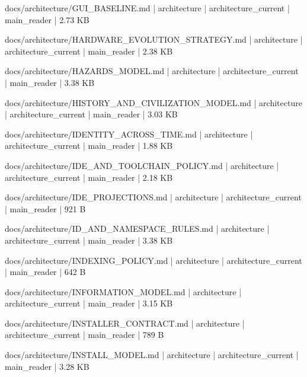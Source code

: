 \documentclass[11pt,a4paper]{report}
\begin{document}
{\small\ttfamily\raggedright docs/\allowbreak{}architecture/\allowbreak{}GUI\_BASELINE.\allowbreak{}md | architecture | architecture\_current | main\_reader | 2.\allowbreak{}73 KB\par}
{\small\ttfamily\raggedright docs/\allowbreak{}architecture/\allowbreak{}HARDWARE\_EVOLUTION\_STRATEGY.\allowbreak{}md | architecture | architecture\_current | main\_reader | 2.\allowbreak{}38 KB\par}
{\small\ttfamily\raggedright docs/\allowbreak{}architecture/\allowbreak{}HAZARDS\_MODEL.\allowbreak{}md | architecture | architecture\_current | main\_reader | 3.\allowbreak{}38 KB\par}
{\small\ttfamily\raggedright docs/\allowbreak{}architecture/\allowbreak{}HISTORY\_AND\_CIVILIZATION\_MODEL.\allowbreak{}md | architecture | architecture\_current | main\_reader | 3.\allowbreak{}03 KB\par}
{\small\ttfamily\raggedright docs/\allowbreak{}architecture/\allowbreak{}IDENTITY\_ACROSS\_TIME.\allowbreak{}md | architecture | architecture\_current | main\_reader | 1.\allowbreak{}88 KB\par}
{\small\ttfamily\raggedright docs/\allowbreak{}architecture/\allowbreak{}IDE\_AND\_TOOLCHAIN\_POLICY.\allowbreak{}md | architecture | architecture\_current | main\_reader | 2.\allowbreak{}18 KB\par}
{\small\ttfamily\raggedright docs/\allowbreak{}architecture/\allowbreak{}IDE\_PROJECTIONS.\allowbreak{}md | architecture | architecture\_current | main\_reader | 921 B\par}
{\small\ttfamily\raggedright docs/\allowbreak{}architecture/\allowbreak{}ID\_AND\_NAMESPACE\_RULES.\allowbreak{}md | architecture | architecture\_current | main\_reader | 3.\allowbreak{}38 KB\par}
{\small\ttfamily\raggedright docs/\allowbreak{}architecture/\allowbreak{}INDEXING\_POLICY.\allowbreak{}md | architecture | architecture\_current | main\_reader | 642 B\par}
{\small\ttfamily\raggedright docs/\allowbreak{}architecture/\allowbreak{}INFORMATION\_MODEL.\allowbreak{}md | architecture | architecture\_current | main\_reader | 3.\allowbreak{}15 KB\par}
{\small\ttfamily\raggedright docs/\allowbreak{}architecture/\allowbreak{}INSTALLER\_CONTRACT.\allowbreak{}md | architecture | architecture\_current | main\_reader | 789 B\par}
{\small\ttfamily\raggedright docs/\allowbreak{}architecture/\allowbreak{}INSTALL\_MODEL.\allowbreak{}md | architecture | architecture\_current | main\_reader | 3.\allowbreak{}28 KB\par}
\end{document}
